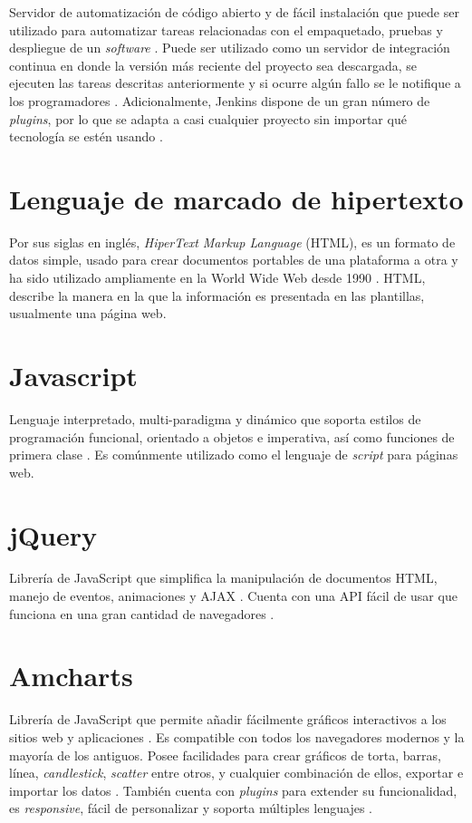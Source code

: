 Servidor de automatización de código abierto y de fácil instalación que puede ser utilizado para automatizar tareas relacionadas con el empaquetado, pruebas y despliegue de un \textit{software} \cite{Jenkins}. Puede ser utilizado como un servidor de integración continua en donde la versión más reciente del proyecto sea descargada, se ejecuten las tareas descritas anteriormente y si ocurre algún fallo se le notifique a los programadores \cite{Jenkins}. Adicionalmente, Jenkins dispone de un gran número de \textit{plugins}, por lo que se adapta a casi cualquier proyecto sin importar qué tecnología se estén usando \cite{Jenkins}.

\section{ Lenguaje de marcado de hipertexto}

Por sus siglas en inglés, \textit{HiperText Markup Language} (HTML), es un formato de datos simple, usado para crear documentos portables de una plataforma a otra y ha sido utilizado ampliamente en la World Wide Web desde 1990 \cite{RFC1866}. HTML, describe la manera en la que la información es presentada en las plantillas, usualmente una página web.

\section{Javascript}

Lenguaje interpretado, multi-paradigma y dinámico que soporta estilos de programación funcional,  orientado a objetos e imperativa, así como funciones de primera clase \cite{javascript}. Es comúnmente utilizado como el lenguaje de \textit{script} para páginas web.

\section{jQuery}

Librería de JavaScript que simplifica la manipulación de documentos HTML, manejo de eventos, animaciones y AJAX \cite{jquery}. Cuenta con una API fácil de usar que funciona en una gran cantidad de navegadores \cite{jquery}.

\section{Amcharts}

Librería de JavaScript que permite añadir fácilmente gráficos
interactivos a los sitios web y aplicaciones \cite{Amcharts}. Es compatible con todos los navegadores modernos y la mayoría de los antiguos. Posee facilidades para crear gráficos de torta, barras, línea, \textit{candlestick}, \textit{scatter} entre otros, y cualquier combinación de ellos, exportar e importar los datos \cite{Amcharts}. También cuenta con \textit{plugins} para extender su funcionalidad, es \textit{responsive}, fácil de personalizar y soporta múltiples lenguajes \cite{Amcharts}.

